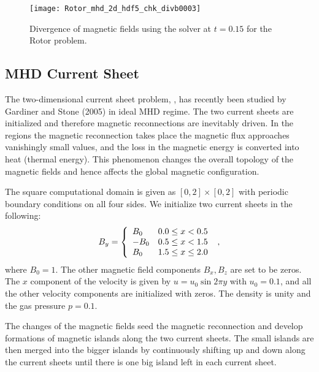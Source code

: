 \begin{figure}[!ht]
\begin{center}
{\leavevmode\texttt{[image: Rotor\_mhd\_2d\_hdf5\_chk\_divb0003]}}
\end{center}
\caption{\label{Fig:RotorDivbUSM} Divergence of magnetic fields using the
 solver at $t=0.15$ for the Rotor problem.}
\end{figure}

\subsection{MHD Current Sheet}
\label{Sec:SimulationCurrentSheet}

The two-dimensional current sheet problem,
, has recently been
studied by Gardiner and Stone (2005) in ideal MHD regime. The two current
sheets are initialized and therefore magnetic reconnections are inevitably driven.
In the regions the magnetic reconnection takes place the magnetic flux approaches 
vanishingly small values, and the loss in the magnetic 
energy is converted into heat (thermal energy). This phenomenon
changes the overall topology of the magnetic fields and hence affects 
the global magnetic configuration.

The square computational domain is given as $[0,2]\times[0,2]$ with periodic 
boundary conditions on all four sides.
We initialize two current sheets in the following:
\begin{equation}
B_y = \left\{ \begin{array}{l@{\quad}l}
              B_0 & 0.0 \leq x <0.5 \\
             -B_0 & 0.5 \leq x <1.5 \\
              B_0 & 1.5 \leq x \leq 2.0
              \end{array} \right.\ ,
\end{equation}
where $B_0=1$. The other magnetic field components $B_x, B_z$ are set to be zeros.
The $x$ component of the velocity is given by $u=u_0\sin2\pi y$ with $u_0=0.1$, and all the other 
velocity components are initialized with zeros. The density is unity and the gas pressure $p=0.1$.

The changes of the magnetic fields seed the magnetic reconnection and develop formations of
magnetic islands along the two current sheets.
The small islands are then merged into the bigger islands by continuously shifting up and 
down along the current sheets until there is one big island left in each current sheet.

